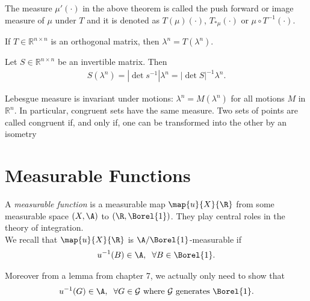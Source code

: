     \begin{definition}
        The measure $\mu'(\cdot)$ in the above theorem is called the push forward or image measure of $\mu$ under $T$ and it is denoted as 
        $T(\mu)(\cdot)$, $T_{*\mu}(\cdot)$ or $\mu\circ T^{-1}(\cdot)$.
    \end{definition}

    \begin{theorem}
        If $T\in \mathbb R^{n\times n} $ is an orthogonal matrix, then $\lambda^n = T(\lambda^n).$
    \end{theorem}

    \begin{theorem}
        Let $S\in\mathbb R^{n\times n}$ be an invertible matrix. Then 
        \begin{align}
        S(\lambda^n) = |\det s^{-1}|\lambda^n = |\det S|^{-1}\lambda^n.    
        \end{align}
    \end{theorem}

    \begin{corollary}
        Lebesgue measure is invariant under motions: $\lambda^n=M(\lambda^n)$ for all motions $M$ in $\mathbb R^n$. In particular, congruent sets have the same measure. Two sets of points are called congruent if, and only if, one can be transformed into the other by an isometry
    \end{corollary}

    
\section{Measurable Functions}

A \textit{measurable function} is a measurable map $\map{u}{X}{ \R}$ from some measurable space $(X,\A)$
 to $(\R,\Borel{1})$.
They play central roles in the theory of integration. \\

We recall that $\map{u}{X}{\R} $ is $\A/\Borel{1}$-measurable if \begin{align}
    u^{-1}(B)\in\A,\hspace{2mm}\forall B\in \Borel{1}.
\end{align}

Moreover from a lemma from chapter 7, we actually only need to show that \begin{align}
    u^{-1}(G)\in\A,\hspace{2mm} \forall G\in\mathcal G \text{ where } \mathcal G \text{ generates } \Borel{1}.
\end{align} 

